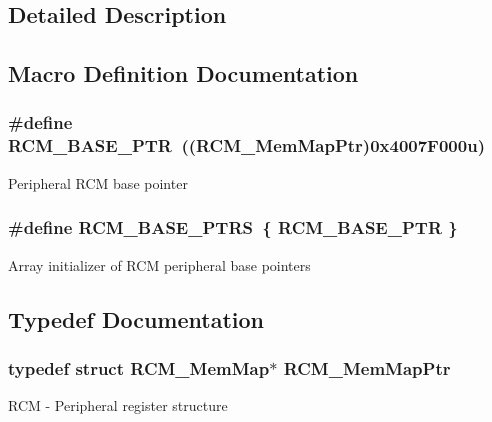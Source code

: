 \subsection{Detailed Description}


\subsection{Macro Definition Documentation}
\hypertarget{group___r_c_m___peripheral_ga25ab3aa8d593d455ed36a52c77f88234}{}
\subsubsection[{R\+C\+M\+\_\+\+B\+A\+S\+E\+\_\+\+P\+T\+R}]{\setlength{\rightskip}{0pt plus 5cm}\#define R\+C\+M\+\_\+\+B\+A\+S\+E\+\_\+\+P\+T\+R~(({\bf R\+C\+M\+\_\+\+Mem\+Map\+Ptr})0x4007\+F000u)}\label{group___r_c_m___peripheral_ga25ab3aa8d593d455ed36a52c77f88234}
Peripheral R\+C\+M base pointer \hypertarget{group___r_c_m___peripheral_gad8549fec4a09b0b485983beadfc3a5fb}{}
\subsubsection[{R\+C\+M\+\_\+\+B\+A\+S\+E\+\_\+\+P\+T\+R\+S}]{\setlength{\rightskip}{0pt plus 5cm}\#define R\+C\+M\+\_\+\+B\+A\+S\+E\+\_\+\+P\+T\+R\+S~\{ {\bf R\+C\+M\+\_\+\+B\+A\+S\+E\+\_\+\+P\+T\+R} \}}\label{group___r_c_m___peripheral_gad8549fec4a09b0b485983beadfc3a5fb}
Array initializer of R\+C\+M peripheral base pointers 

\subsection{Typedef Documentation}
\hypertarget{group___r_c_m___peripheral_ga787b1c58d947f0b81c2502227dd0396b}{}
\subsubsection[{R\+C\+M\+\_\+\+Mem\+Map\+Ptr}]{\setlength{\rightskip}{0pt plus 5cm}typedef struct {\bf R\+C\+M\+\_\+\+Mem\+Map}$\ast$ {\bf R\+C\+M\+\_\+\+Mem\+Map\+Ptr}}\label{group___r_c_m___peripheral_ga787b1c58d947f0b81c2502227dd0396b}
R\+C\+M -\/ Peripheral register structure 